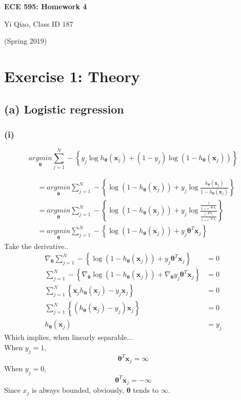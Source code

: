 \documentclass[11pt]{article}
\begin{document}
\begin{center}
\Large{\textbf{ECE 595: Homework 4}}

Yi Qiao, Class ID 187

(Spring 2019)
\end{center}

\section*{Exercise 1: Theory}
\subsection*{(a) Logistic regression}
\subsubsection*{(i)}
$$\underset{\pmb{\theta}}{argmin} \sum_{j=1}^{N}-\left\{y_j\log h_{\pmb{\theta}}(\pmb{x}_j)+\left(1-y_j\right) \log (1-h_{\pmb{\theta}}(\pmb{x}_j)) \right\}$$

\begin{equation}
\begin{split}
&=\underset{\pmb{\theta}}{argmin} \sum_{j=1}^{N}-\left\{\log (1-h_{\pmb{\theta}}(\pmb{x}_j))+y_j \log \frac{h_{\pmb{\theta}}(\pmb{x}_j)}{1-h_{\pmb{\theta}}(\pmb{x}_j)} \right\}\\
&=\underset{\pmb{\theta}}{argmin} \sum_{j=1}^{N}-\left\{\log (1-h_{\pmb{\theta}}(\pmb{x}_j))+y_j \log \frac{\frac{1}{1+e^{-\pmb{\theta}^T\pmb{x}_j}}}{\frac{e^{-\pmb{\theta}^T\pmb{x}_j}}{1+e^{-\pmb{\theta}^T\pmb{x}_j}}} \right\}\\
&=\underset{\pmb{\theta}}{argmin} \sum_{j=1}^{N}-\left\{\log(1-h_{\pmb{\theta}}(\pmb{x}_j))+y_j\pmb{\theta}^T\pmb{x}_j \right\}
\end{split}
\end{equation}
Take the derivative..
\begin{equation}
\begin{split}
\nabla_{\pmb{\theta}}\sum_{j=1}^{N}-\left\{\log(1-h_{\pmb{\theta}}(\pmb{x}_j))+y_j\pmb{\theta}^T\pmb{x}_j \right\}&=0\\
\sum_{j=1}^{N}-\left\{\nabla_{\pmb{\theta}}\log(1-h_{\pmb{\theta}}(\pmb{x}_j))+\nabla_{\pmb{\theta}}y_j\pmb{\theta}^T\pmb{x}_j \right\}&=0\\
\sum_{j=1}^{N}\left\{\pmb{x}_jh_{\pmb{\theta}}(\pmb{x}_j)-y_j\pmb{x}_j \right\}&=0\\
\sum_{j=1}^{N}\left\{\left(h_{\pmb{\theta}}(\pmb{x}_j)-y_j\right)\pmb{x}_j \right\}&=0\\
h_{\pmb{\theta}}(\pmb{x}_j)&=y_j
\end{split}
\end{equation}
Which implies, when linearly separable...\\
When $y_j = 1$,
$$\pmb{\theta}^T\pmb{x}_j = \infty$$
When $y_j = 0$,
$$\pmb{\theta}^T\pmb{x}_j = -\infty$$
Since $x_j$ is always bounded, obviously, $\pmb{\theta}$ tends to $\infty$. 
\pagebreak
\end{document}
